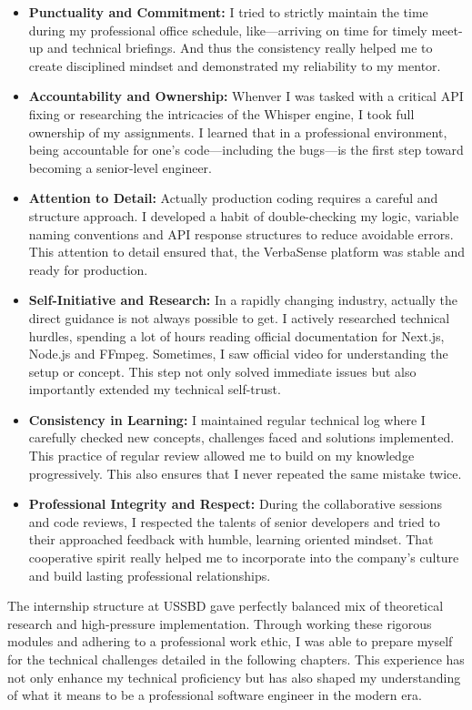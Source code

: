 \documentclass[oneside]{thesis-library}
\begin{document}
\begin{itemize}
    \item \textbf{Punctuality and Commitment:} I tried to strictly maintain the time during my professional office schedule, like---arriving on time for timely meet-up and technical briefings. And thus the consistency really helped me to create disciplined mindset and demonstrated my reliability to my mentor.
    \item \textbf{Accountability and Ownership:} Whenver I was tasked with a critical API fixing or researching the intricacies of the Whisper engine, I took full ownership of my assignments. I learned that in a professional environment, being accountable for one’s code---including the bugs---is the first step toward becoming a senior-level engineer.
    \item \textbf{Attention to Detail:} Actually production coding requires a careful and structure approach. I developed a habit of double-checking my logic, variable naming conventions and API response structures to reduce avoidable errors. This attention to detail ensured that, the VerbaSense platform was stable and ready for production.
    \item \textbf{Self-Initiative and Research:} In a rapidly changing industry, actually the direct guidance is not always possible to get. I actively researched technical hurdles, spending a lot of hours reading official documentation for Next.js, Node.js and FFmpeg. Sometimes, I saw official video for understanding the setup or concept. This step not only solved immediate issues but also importantly extended my technical self-trust.
    \item \textbf{Consistency in Learning:} I maintained regular technical log where I carefully checked new concepts, challenges faced and solutions implemented. This practice of regular review allowed me to build on my knowledge progressively. This also ensures that I never repeated the same mistake twice.
    \item \textbf{Professional Integrity and Respect:} During the collaborative sessions and code reviews, I respected the talents of senior developers and tried to their approached feedback with humble, learning oriented mindset. That cooperative spirit really helped me to incorporate into the company’s culture and build lasting professional relationships.
\end{itemize}

The internship structure at USSBD gave perfectly balanced mix of theoretical research and high-pressure implementation. Through working these rigorous modules and adhering to a professional work ethic, I was able to prepare myself for the technical challenges detailed in the following chapters. This experience has not only enhance my technical proficiency but has also shaped my understanding of what it means to be a professional software engineer in the modern era.
\end{document}
